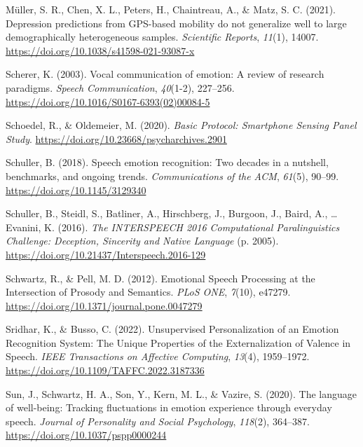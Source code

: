\documentclass[
  english,
  man,floatsintext]{apa6}
\newlength{\cslhangindent}
\newenvironment{CSLReferences}[2] %
 {%
  \setlength{\parindent}{0pt}
  \ifodd #1 \everypar{\setlength{\hangindent}{\cslhangindent}}\ignorespaces\fi
  \ifnum #2 > 0
  \setlength{\parskip}{#2\baselineskip}
  \fi
 }%
 {}
\begin{document}
\begin{CSLReferences}{1}{0}
\leavevmode{}%
Müller, S. R., Chen, X. L., Peters, H., Chaintreau, A., \& Matz, S. C. (2021). Depression predictions from {GPS-based} mobility do not generalize well to large demographically heterogeneous samples. \emph{Scientific Reports}, \emph{11}(1), 14007. \url{https://doi.org/10.1038/s41598-021-93087-x}

\leavevmode{}%
Scherer, K. (2003). Vocal communication of emotion: {A} review of research paradigms. \emph{Speech Communication}, \emph{40}(1-2), 227--256. \url{https://doi.org/10.1016/S0167-6393(02)00084-5}

\leavevmode{}%
Schoedel, R., \& Oldemeier, M. (2020). \emph{Basic {Protocol}: {Smartphone Sensing Panel Study}}. \url{https://doi.org/10.23668/psycharchives.2901}

\leavevmode{}%
Schuller, B. (2018). Speech emotion recognition: Two decades in a nutshell, benchmarks, and ongoing trends. \emph{Communications of the ACM}, \emph{61}(5), 90--99. \url{https://doi.org/10.1145/3129340}

\leavevmode{}%
Schuller, B., Steidl, S., Batliner, A., Hirschberg, J., Burgoon, J., Baird, A., \ldots{} Evanini, K. (2016). \emph{The {INTERSPEECH} 2016 {Computational Paralinguistics Challenge}: {Deception}, {Sincerity} and {Native Language}} (p. 2005). \url{https://doi.org/10.21437/Interspeech.2016-129}

\leavevmode{}%
Schwartz, R., \& Pell, M. D. (2012). Emotional {Speech Processing} at the {Intersection} of {Prosody} and {Semantics}. \emph{PLoS ONE}, \emph{7}(10), e47279. \url{https://doi.org/10.1371/journal.pone.0047279}

\leavevmode{}%
Sridhar, K., \& Busso, C. (2022). Unsupervised {Personalization} of an {Emotion Recognition System}: {The Unique Properties} of the {Externalization} of {Valence} in {Speech}. \emph{IEEE Transactions on Affective Computing}, \emph{13}(4), 1959--1972. \url{https://doi.org/10.1109/TAFFC.2022.3187336}

\leavevmode{}%
Sun, J., Schwartz, H. A., Son, Y., Kern, M. L., \& Vazire, S. (2020). The language of well-being: {Tracking} fluctuations in emotion experience through everyday speech. \emph{Journal of Personality and Social Psychology}, \emph{118}(2), 364--387. \url{https://doi.org/10.1037/pspp0000244}


\end{CSLReferences}
\end{document}
